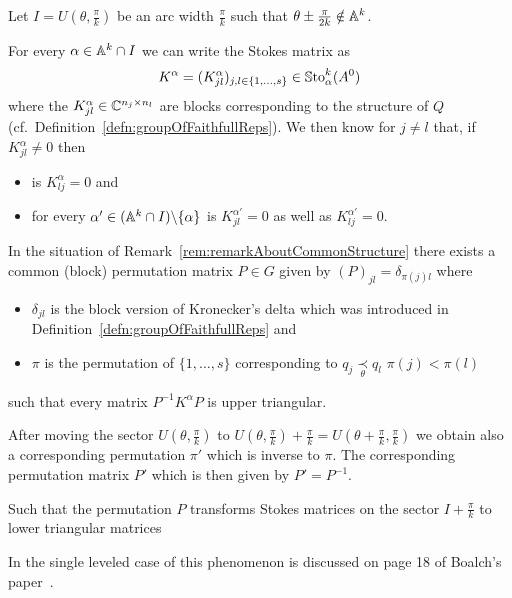 Let $I=U(\theta,\frac{\pi}{k})$ be an arc width $\frac{\pi}{k}$ such that
$\theta\pm\frac{\pi}{2k}\notin\mathbb{A}^k$.
\begin{rem}\label{rem:remarkAboutCommonStructure}
  For every $\alpha\in\mathbb{A}^k\cap I$ we can write the Stokes matrix as
  \[
    K^\alpha=(K^\alpha_{jl})_{j,l\in\{1,\dots,s\}}\in\operatorname{\mathbb{S}to}_\alpha^k(A^0)
  \]
  where the $K^\alpha_{jl}\in\mathbb{C}^{n_j\times n_l}$ are blocks corresponding to
  the structure of $Q$ (cf.\ Definition~\ref{defn:groupOfFaithfullReps}).
  We then know for $j\neq l$ that, if $K^\alpha_{jl}\neq0$ then
  \begin{itemize}
    \item is $K^\alpha_{lj}=0$ and
    \item for every $\alpha'\in(\mathbb{A}^k\cap I)\backslash\{\alpha\}$ is
      $K^{\alpha'}_{jl}=0$ as well as $K^{\alpha'}_{lj}=0$.
  \end{itemize}
\end{rem}
\begin{rem}
  In the situation of Remark~\ref{rem:remarkAboutCommonStructure}
  there exists a common (block) permutation matrix $P\in G$ given by
  $(P)_{jl}=\delta_{\pi(j)l}$ where
  \begin{itemize}
    \item $\delta_{jl}$ is the block version of Kronecker's delta which was
      introduced in Definition~\ref{defn:groupOfFaithfullReps} and
    \item $\pi$ is the permutation of $\{1,\dots,s\}$ corresponding to
      $q_j\underset{\theta}{\prec}q_l$ \Leftrightarrow{} $\pi(j)<\pi(l)$
  \end{itemize}
  such that every matrix $P^{-1}K^{\alpha}P$ is upper triangular.
  \begin{s-rem}
    After moving the sector $U(\theta,\frac{\pi}{k})$ to
    $U(\theta,\frac{\pi}{k})+\frac{\pi}{k}
    =U(\theta+\frac{\pi}{k},\frac{\pi}{k})$ we obtain also a corresponding
    permutation $\pi'$ which is inverse to $\pi$.
    The corresponding permutation matrix $P'$ which is then given by
    $P'=P^{-1}$.

    Such that the permutation $P$ transforms Stokes matrices on the sector
    $I+\frac{\pi}{k}$ to lower triangular matrices
  \end{s-rem}
  In the single leveled case of this phenomenon is discussed on page 18 of
  Boalch's paper~\cite{boalch}.
\end{rem}

